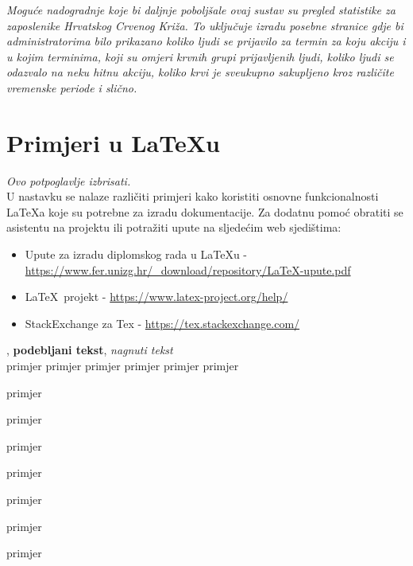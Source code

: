 		\textit{Moguće nadogradnje koje bi daljnje poboljšale ovaj sustav su pregled statistike za zaposlenike Hrvatskog Crvenog Križa. To uključuje izradu posebne stranice gdje bi administratorima bilo prikazano koliko ljudi se prijavilo za termin za koju akciju i u kojim terminima, koji su omjeri krvnih grupi prijavljenih ljudi, koliko ljudi se odazvalo na neku hitnu akciju, koliko krvi je sveukupno sakupljeno kroz različite vremenske periode i slično.}



		\eject
		
		\section{Primjeri u \LaTeX u}
		
		\textit{Ovo potpoglavlje izbrisati.}\\

		U nastavku se nalaze različiti primjeri kako koristiti osnovne funkcionalnosti \LaTeX a koje su potrebne za izradu dokumentacije. Za dodatnu pomoć obratiti se asistentu na projektu ili potražiti upute na sljedećim web sjedištima:
		\begin{itemize}
			\item Upute za izradu diplomskog rada u \LaTeX u - \url{https://www.fer.unizg.hr/_download/repository/LaTeX-upute.pdf}
			\item \LaTeX\ projekt - \url{https://www.latex-project.org/help/}
			\item StackExchange za Tex - \url{https://tex.stackexchange.com/}\\
		
		\end{itemize} 	


		
		\noindent {}, \textbf{podebljani tekst}, 	\textit{nagnuti tekst}\\
		\noindent \normalsize primjer \large primjer \Large primjer \LARGE {primjer} \huge {primjer} \Huge primjer \normalsize
				
		\begin{packed_item}
			
			\item  primjer
			\item  primjer
			\item  primjer
			\item[] \begin{packed_enum}
				\item primjer
				\item[] \begin{packed_enum}
					\item[1.a] primjer
					\item[b] primjer
				\end{packed_enum}
				\item primjer
			\end{packed_enum}
			
		\end{packed_item}
		
